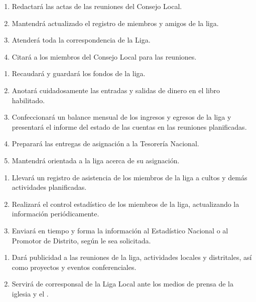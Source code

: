\begin{enumerate}[noitemsep]
    \item Redactará las actas de las reuniones del Consejo Local.
    \item Mantendrá actualizado el registro de miembros y amigos de la liga.
    \item Atenderá toda la correspondencia de la Liga.
    \item Citará a los miembros del Consejo Local para las reuniones.
\end{enumerate}

\begin{enumerate}[noitemsep]
    \item Recaudará y guardará los fondos de la liga.
    \item Anotará cuidadosamente las entradas y salidas de dinero en el libro habilitado.
    \item Confeccionará un balance mensual de los ingresos y egresos de la liga y presentará el informe del estado de las cuentas en las reuniones planificadas.
    \item Preparará las entregas de asignación a la Tesorería Nacional.
    \item Mantendrá orientada a la liga acerca de su asignación.
\end{enumerate}

\begin{enumerate}[noitemsep]
    \item Llevará un registro de asistencia de los miembros de la liga a cultos y demás actividades planificadas.
    \item Realizará el control estadístico de los miembros de la liga, actualizando la información periódicamente.
    \item Enviará en tiempo y forma la información al Estadístico Nacional o al Promotor de Distrito, según le sea solicitada.
\end{enumerate}

\begin{enumerate}[noitemsep]
    \item Dará publicidad a las reuniones de la liga, actividades locales y distritales, así como proyectos y eventos conferenciales.
    \item Servirá de corresponsal de la Liga Local ante los medios de prensa de la iglesia y el \OOLMJ{}.
\end{enumerate}

